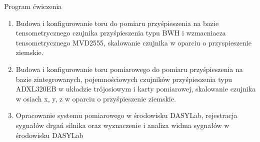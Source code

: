 \documentclass[12pt]{article}
\begin{document}
 
 


\begin{section}{Program ćwiczenia}
	\begin{enumerate}
	  	\item Budowa i konfigurowanie toru do pomiaru przyśpieszenia na bazie
	  	tensometrycznego czujnika przyśpieszenia typu BWH i wzmacniacza
	  	tensometrycznego MVD2555, skalowanie czujnika w oparciu o przyspieszenie
	  	ziemskie.
		\item Budowa i konfigurowanie toru pomiarowego do pomiaru przyśpieszenia na
		bazie zintegrowanych, pojemnościowych czujników przyśpieszenia typu ADXL320EB
		w układzie trójosiowym i karty pomiarowej, skalowanie czujnika w osiach x, y,
		z w oparciu o przyśpieszenie ziemskie.
		\item Opracowanie systemu pomiarowego w środowisku DASYLab, rejestracja
		sygnałów drgań silnika oraz wyznaczenie i analiza widma sygnałów w środowisku
		DASYLab
	\end{enumerate}
\end{section}
\end{document}
